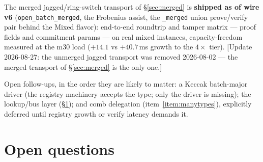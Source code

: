 \documentclass[11pt]{article}
\newcommand{\code}[1]{\texttt{#1}}
\theoremstyle{definition}
\begin{document}
The merged jagged/ring-switch transport of \S\ref{sec:merged} is
\textbf{shipped as of wire v6} (\code{open\_batch\_merged}, the
Frobenius assist, the \code{\_merged} union prove/verify pair behind
the Mixed flavor): end-to-end roundtrip and tamper matrix --- proof
fields and commitment params --- on real mixed instances,
capacity-freedom measured at the m30 load ($+14.1$ vs $+40.7$\,ms
growth to the $4\times$ tier). [Update 2026-08-27: the unmerged jagged
transport was removed 2026-08-02 — the merged transport of
\S\ref{sec:merged} is the only one.]

Open follow-ups, in the order they are likely to matter: a Keccak
batch-major driver (the registry machinery accepts the type; only the
driver is missing); the lookup/bus layer (\S\ref{sec:open}); and
comb delegation (item~\ref{item:manytypes}), explicitly deferred until
registry growth or verify latency demands it.

\section{Open questions}\label{sec:open}
\end{document}
